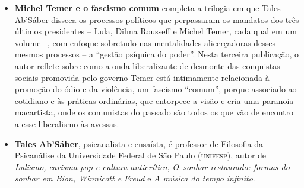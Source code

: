 \begin{itemize}


\item \textbf{Michel Temer e o fascismo comum} completa a trilogia em que Tales Ab'Sáber disseca
os processos políticos que perpassaram os mandatos dos três últimos presidentes -- Lula, Dilma
Rousseff e Michel Temer, cada qual em um volume --, com enfoque sobretudo nas mentalidades
alicerçadoras desses mesmos processos -- a ``gestão psíquica do poder''.
Nesta terceira publicação, o autor reflete sobre como a onda liberalizante de desmonte das
conquistas sociais promovida pelo governo Temer está
intimamente relacionada à promoção do ódio e da violência, um fascismo
``comum'', porque associado ao cotidiano e às práticas ordinárias, que entorpece a visão
e cria uma paranoia macartista, onde os comunistas do passado são todos os que
vão de encontro a esse liberalismo às avessas.
  
\item \textbf{Tales Ab’Sáber}, psicanalista e ensaísta, é professor de Filosofia da Psicanálise da Universidade Federal 
de São Paulo (\textsc{unifesp}), autor de 
\emph{Lulismo, carisma pop e cultura anticrítica},
\textit{O~sonhar
restaurado: formas do sonhar em Bion, Winnicott e Freud} e
\textit{A música do tempo infinito}. 

\end{itemize}

